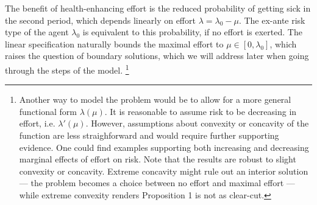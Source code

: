 The benefit of health-enhancing effort is the reduced probability of getting sick in the second period, which depends linearly on effort $\lambda=\lambda_0-\mu$.
The ex-ante risk type of the agent $\lambda_0$ is equivalent to this probability, if no effort is exerted.
The linear specification naturally bounds the maximal effort to $\mu\in\left[ 0,\lambda_0\right]$, which raises the question of boundary solutions, which we will address later when going through the steps of the model.%
\footnote{Another way to model the problem would be to allow for a more general functional form $\lambda(\mu)$.
It is reasonable to assume risk to be decreasing in effort, i.e. $\lambda'(\mu)$.
However, assumptions about convexity or concavity of the function are less straighforward and would require further supporting evidence.
One could find examples supporting both increasing and decreasing marginal effects of effort on risk.
Note that the results are robust to slight convexity or concavity.
Extreme concavity might rule out an interior solution --- the problem becomes a choice between no effort and maximal effort ---  while extreme convexity renders Proposition 1 is not as clear-cut.}



